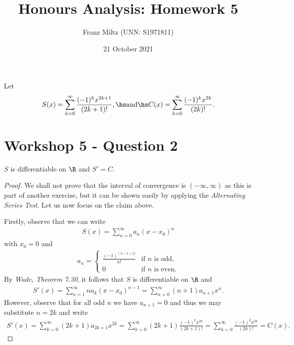 \documentclass{article}
\begin{document}
\title{Honours Analysis: Homework 5}
\author{Franz Miltz (UNN: S1971811)}
\date{21 October 2021}
\maketitle

Let
\begin{align*}
   S(x) =\sum_{k=0}^\infty \frac{(-1)^k x^{2k+1}}{(2k+1)!},\hs \text{and}\hs
   C(x) = \sum_{k=0}^\infty \frac{(-1)^k x^{2k}}{(2k)!}.
\end{align*}

\section*{Workshop 5 - Question 2}

\begin{claim*}
   $S$ is differentiable on $\R$ and $S'=C$.
\end{claim*}

\begin{proof}
   We shall not prove that the interval of convergence is $(-\infty,\infty)$
   as this is part of another exercise, but it can be shown easily by 
   applying the \emph{Alternating Series Test}. Let us now focus on the claim above.
   
   Firstly, observe that we can write 
   \begin{align*}
      S(x) = \sum_{n=0}^\infty a_n(x-x_0)^n
   \end{align*}
   with $x_0 = 0$ and 
   \begin{align*}
      a_n = \begin{cases}
         \frac{(-1)^{(n-1)/2}}{n!} &\text{if $n$ is odd},\\
         0 &\text{if $n$ is even}.
      \end{cases}
   \end{align*}
   By \emph{Wade, Theorem 7.30}, it follows that $S$ is differentiable on $\R$
   and 
   \begin{align*}
      S'(x) = \sum_{n=1}^\infty na_k(x-x_0)^{n-1}
      = \sum_{n=0}^\infty (n+1)a_{n+1}x^n.
   \end{align*}
   However, observe that for all odd $n$ we have $a_{n+1}=0$
   and thus we may substitute $n=2k$ and write 
   \begin{align*}
      S'(x) = \sum_{k=0}^\infty (2k+1)a_{2k+1}x^{2k}
      = \sum_{k=0}^\infty (2k+1)\frac{(-1)^k x^{2k}}{(2k+1)!}
      = \sum_{k=0}^\infty \frac{(-1)^k x^{2k}}{(2k)!} = C(x).
   \end{align*}
\end{proof}
\end{document}
